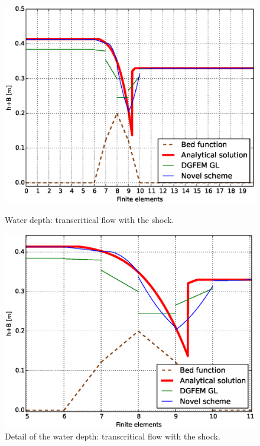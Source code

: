 				\begin{figure}[!ht]
								\centering
								 \begin{minipage}[t]{0.44\textwidth}
								    \begin{center}
								    \includegraphics[width=1.0\textwidth]{OBR/bump/shockH.eps}
								    \caption{Water depth: transcritical flow with the shock.}
								    \label{shockH}
								    \end{center}
								\end{minipage}\hspace{15mm}
								\begin{minipage}[t]{0.44\textwidth}
								    \begin{center}
								    \includegraphics[width=1.0\textwidth]{OBR/bump/shockHdet.eps}
								    \caption{Detail of the water depth: transcritical flow with the shock.}
								    \label{shockHdet}
								    \end{center}
								\end{minipage}
				\end{figure}
